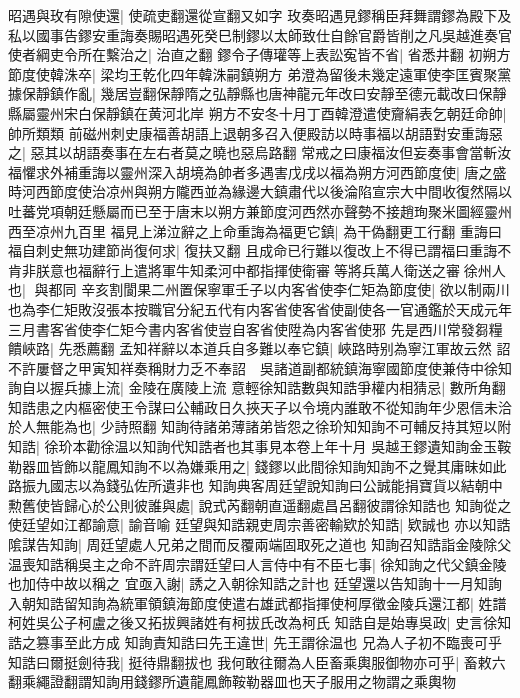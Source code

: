 昭遇與玫有隙使還|{
	使疏吏翻還從宣翻又如字}
玫奏昭遇見鏐稱臣拜舞謂鏐為殿下及私以國事告鏐安重誨奏賜昭遇死癸巳制鏐以太師致仕自餘官爵皆削之凡吳越進奏官使者綱吏令所在繫治之|{
	治直之翻}
鏐令子傳瓘等上表訟寃皆不省|{
	省悉井翻}
初朔方節度使韓洙卒|{
	梁均王乾化四年韓洙嗣鎮朔方}
弟澄為留後未幾定遠軍使李匡賓聚黨據保靜鎮作亂|{
	幾居豈翻保靜隋之弘靜縣也唐神龍元年改曰安靜至德元載改曰保靜縣屬靈州宋白保靜鎮在黄河北岸}
朔方不安冬十月丁酉韓澄遣使齎絹表乞朝廷命帥|{
	帥所類類}
前磁州刺史康福善胡語上退朝多召入便殿訪以時事福以胡語對安重誨惡之|{
	惡其以胡語奏事在左右者莫之曉也惡烏路翻}
常戒之曰康福汝但妄奏事會當斬汝福懼求外補重誨以靈州深入胡境為帥者多遇害戊戌以福為朔方河西節度使|{
	唐之盛時河西節度使治凉州與朔方隴西並為緣邊大鎮肅代以後淪陷宣宗大中間收復然隔以吐蕃党項朝廷懸屬而已至于唐末以朔方兼節度河西然亦聲勢不接趙珣聚米圖經靈州西至凉州九百里}
福見上涕泣辭之上命重誨為福更它鎮|{
	為干偽翻更工行翻}
重誨曰福自刺史無功建節尚復何求|{
	復扶又翻}
且成命已行難以復改上不得已謂福曰重誨不肯非朕意也福辭行上遣將軍牛知柔河中都指揮使衛審等將兵萬人衛送之審徐州人也|{
	與都同}
辛亥割閬果二州置保寧軍壬子以内客省使李仁矩為節度使|{
	欲以制兩川也為李仁矩敗沒張本按職官分紀五代有内客省使客省使副使各一官通鑑於天成元年三月書客省使李仁矩今書内客省使豈自客省使陞為内客省使邪}
先是西川常發芻糧饋峽路|{
	先悉薦翻}
孟知祥辭以本道兵自多難以奉它鎮|{
	峽路時别為寧江軍故云然}
詔不許屢督之甲寅知祥奏稱財力乏不奉詔　吳諸道副都統鎮海寧國節度使兼侍中徐知詢自以握兵據上流|{
	金陵在廣陵上流}
意輕徐知誥數與知誥爭權内相猜忌|{
	數所角翻}
知誥患之内樞密使王令謀曰公輔政日久挾天子以令境内誰敢不從知詢年少恩信未洽於人無能為也|{
	少詩照翻}
知詢待諸弟薄諸弟皆怨之徐玠知知詢不可輔反持其短以附知誥|{
	徐玠本勸徐温以知詢代知誥者也其事見本卷上年十月}
吳越王鏐遺知詢金玉鞍勒器皿皆飾以龍鳳知詢不以為嫌乘用之|{
	錢鏐以此間徐知詢知詢不之覺其庸昧如此路振九國志以為錢弘佐所遺非也}
知詢典客周廷望說知詢曰公誠能捐寶貨以結朝中勲舊使皆歸心於公則彼誰與處|{
	說式芮翻朝直遥翻處昌呂翻彼謂徐知誥也}
知詢從之使廷望如江都諭意|{
	諭音喻}
廷望與知誥親吏周宗善密輸欵於知誥|{
	欵誠也}
亦以知誥隂謀告知詢|{
	周廷望處人兄弟之間而反覆兩端固取死之道也}
知詢召知誥詣金陵除父温喪知誥稱吳主之命不許周宗謂廷望曰人言侍中有不臣七事|{
	徐知詢之代父鎮金陵也加侍中故以稱之}
宜亟入謝|{
	誘之入朝徐知誥之計也}
廷望還以告知詢十一月知詢入朝知誥留知詢為統軍領鎮海節度使遣右雄武都指揮使柯厚徵金陵兵還江都|{
	姓譜柯姓吳公子柯盧之後又拓拔興諸姓有柯拔氏改為柯氏}
知誥自是始專吳政|{
	史言徐知誥之篡事至此方成}
知詢責知誥曰先王違世|{
	先王謂徐温也}
兄為人子初不臨喪可乎知誥曰爾挺劍待我|{
	挺待鼎翻拔也}
我何敢往爾為人臣畜乘輿服御物亦可乎|{
	畜敕六翻乘繩證翻謂知詢用錢鏐所遺龍鳳飾鞍勒器皿也天子服用之物謂之乘輿物}

